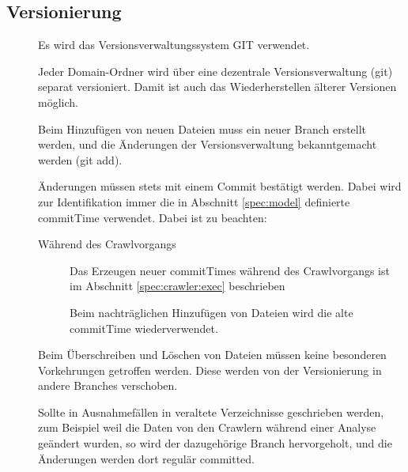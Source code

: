 \subsection{Versionierung}
\begin{description}
	\item []
		Es wird das Versionsverwaltungssystem GIT verwendet.
	\item []	
		Jeder Domain-Ordner wird über eine dezentrale Versionsverwaltung (git) separat versioniert. 
		Damit ist auch das Wiederherstellen älterer Versionen möglich.
	\item []
		Beim Hinzufügen von neuen Dateien muss ein neuer Branch erstellt werden, und die Änderungen der Versionsverwaltung bekanntgemacht werden (git add).
	\item []
		Änderungen müssen stets mit einem Commit bestätigt werden.
		Dabei wird zur Identifikation immer die in Abschnitt \ref{spec:model} 
		definierte commitTime verwendet.
		Dabei ist zu beachten:
		\begin{description}
			\item [Während des Crawlvorgangs]
				Das Erzeugen neuer commitTimes während des Crawlvorgangs ist 
				im Abschnitt \ref{spec:crawler:exec} beschrieben
			\item []
				Beim nachträglichen Hinzufügen von Dateien wird die alte commitTime wiederverwendet.
		\end{description}
	\item []
		Beim Überschreiben und Löschen von Dateien müssen keine besonderen Vorkehrungen getroffen werden.
		Diese werden von der Versionierung in andere Branches verschoben.
	\item []
		Sollte in Ausnahmefällen in veraltete Verzeichnisse geschrieben werden, 
		zum Beispiel weil die Daten von den Crawlern während einer Analyse geändert wurden,
		so wird der dazugehörige Branch hervorgeholt, und die Änderungen werden dort regulär committed.
\end{description}


